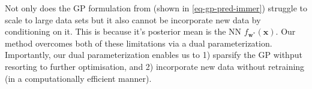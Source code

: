 \documentclass{article}
\newcommand{\mbf}[1]{\mathbf{#1}}
\renewcommand{\mid}{\,|\,}
\newcommand{\MS}{\mbf{S}}
\newcommand{\vm}{\mbf{m}}
\newcommand{\vu}{\mbf{u}}
\newcommand{\vx}{\mbf{x}}
\newcommand{\vw}{\mbf{w}}
\begin{document}
Not only does the GP formulation from \citet{immer2021improving} (shown in \cref{eq-gp-pred-immer}) struggle to scale to large data sets but
it also cannot be incorporate new data by conditioning on it.
This is because it's posterior mean is the NN  $f_{\vw^*}(\vx)$.
Our method overcomes both of these limitations via a dual parameterization.
Importantly, our dual parameterization enables us to 1) sparsify the GP withput resorting to further optimisation, and 2)
incorporate new data without retraining (in a computationally efficient manner).





\end{document}
